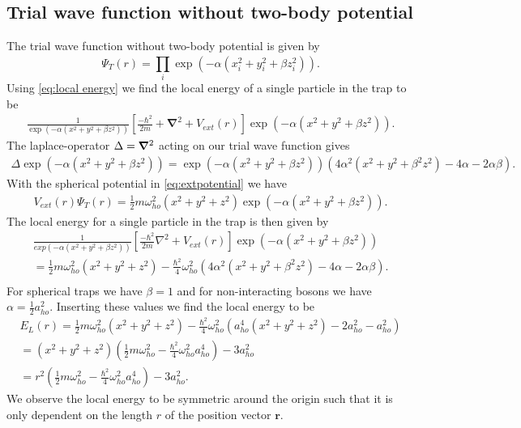 \subsection{Trial wave function without two-body potential}
\label{sec:Trial wave function without two-body potential}
The trial wave function without two-body potential is given by
\begin{equation}
	\label{eq:trial wave function without two-body potential}
	\Psi_T(r) = \prod_{i}^{} \exp(-\alpha (x_i^2 + y_i^2 + \beta z_i^2)) .
\end{equation}
Using \autoref{eq:local energy} we find the local energy of a single particle in the trap to be
\begin{gather*}
	\frac{1}{\exp(-\alpha (x^2+y^2+\beta z^2))}\left[\frac{-\hbar^2}{2m} +\boldsymbol{\nabla}^2 + V _{ext}(r)\right]	\exp(-\alpha (x^2+y^2+\beta z^2)).
\end{gather*}
The laplace-operator $\Delta  = \grad^2$  acting on our trial wave function gives
\begin{gather*}
	\Delta \exp(-\alpha (x^2+y^2+\beta z^2)) = \exp(-\alpha (x^2+y^2+\beta z^2)) \left(4\alpha^2 (x^2+y^2+\beta^2 z^2) - 4 \alpha -2\alpha \beta \right).
\end{gather*}
With the spherical potential in \autoref{eq:extpotential} we have
\begin{gather*}
	V _{ext}(r) \Psi _T(r) = \frac{1}{2}m \omega _{ho}^2(x^2+y^2+z^2) \exp(-\alpha (x^2+y^2+\beta z^2)).
\end{gather*}
The local energy for a single particle in the trap is then given by
\begin{gather*}
	\frac{1}{exp(-\alpha (x^2+y^2+\beta z^2))}\left[\frac{-\hbar^2}{2m} \nabla^2 + V _{ext}(r)\right]	\exp(-\alpha (x^2+y^2+\beta z^2)) \\
	= \frac{1}{2}m \omega _{ho}^2(x^2+y^2+z^2) - \frac{\hbar ^2}{4} \omega _{ho}^2 \left(4\alpha^2 (x^2+y^2+\beta^2 z^2) - 4 \alpha -2\alpha \beta \right).\\
\end{gather*}
For spherical traps we have $\beta = 1$ and for non-interacting bosons we have $\alpha =\frac{1}{2}a ^2 _{ho}$. Inserting
these values we find the local energy to be
\begin{gather*}
	E_L(r) = \frac{1}{2}m \omega _{ho}^2(x^2+y^2+z^2) - \frac{\hbar ^2}{4} \omega _{ho}^2 \left(a _{ho}^4 (x^2+y^2+z^2) - 2 a^2 _{ho} -a^2 _{ho} \right) \\
	= (x^2+y^2+z^2)\left(\frac{1}{2}m\omega _{ho}^2-\frac{\hbar ^2}{4}\omega _{ho}^2a^4 _{ho}\right)-3a^2 _{ho} \\
	= r^2 \left(\frac{1}{2}m\omega _{ho}^2-\frac{\hbar ^2}{4}\omega _{ho}^2a^4 _{ho}\right)-3a^2 _{ho}.
\end{gather*}
We observe the local energy to be symmetric around the origin such that it is only dependent on the
length $r$ of the position vector $\boldsymbol{r}$.


